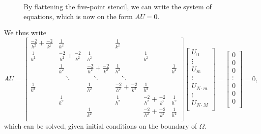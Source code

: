 \begin{figure}[htb]
    \centering
    
    \label{ex3:fig:flat_stencil}
    \caption{By flattening the five-point stencil, we can write the system of equations, which is now on the form $AU = 0$.} 
\end{figure}

We thus write
\begin{equation*}
    \renewcommand{\arraystretch}{2.5} %
    AU = 
    \begin{bmatrix}
        \frac{-2}{h^2} + \frac{-2}{k^2} & \frac{1}{h^2} &&\frac{1}{k^2}\\
        \frac{1}{h^2} & \frac{-2}{h^2} + \frac{-2}{k^2}   & \frac{1}{h^2} &&\frac{1}{k^2}\\
        & \frac{1}{h^2} & \frac{-2}{h^2} + \frac{-2}{k^2}   & \frac{1}{h^2} &&\frac{1}{k^2}\\
        &  \quad \ddots & \quad \ddots  & \quad \ddots \\
        \frac{1}{k^2} && \frac{1}{h^2} & \frac{-2}{h^2} + \frac{-2}{k^2} & \frac{1}{h^2} \\
        & \frac{1}{k^2} && \frac{1}{h^2} & \frac{-2}{h^2} + \frac{-2}{k^2}   & \frac{1}{h^2} \\
        && \frac{1}{k^2} && \frac{-2}{h^2} + \frac{-2}{k^2} & \frac{1}{h^2} \\
    \end{bmatrix}
    \begin{bmatrix}
    U_{0} \\ \vdots \\ U_{m} \\ \vdots \\ U_{N \cdot m} \\ \vdots \\ U_{N \cdot M} \\
    \end{bmatrix}
    =
    \begin{bmatrix}
    0 \\ 0 \\ 0 \\ \vdots \\ 0 \\ 0 \\ 0 \\
    \end{bmatrix}
    = 0,
    \label{ex3:eq:solution_equation}
\end{equation*}
which can be solved, given initial conditions on the boundary of $\Omega$.

